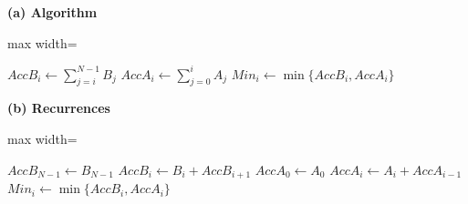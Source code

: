 


\begin{minipage}[t]{0.48\linewidth}
\textbf{(a) Algorithm}\par\smallskip
\begin{adjustbox}{max width=\linewidth}
\begin{minipage}{\textwidth}
\begin{algorithmic}[1]
    \State $AccB_i \gets \sum_{j=i}^{N-1} B_j$
    \State $AccA_i \gets \sum_{j=0}^{i} A_j$
    \State \mbox{$Min_i \gets \min\{AccB_i,AccA_i\}$}
\EndFor
\end{algorithmic}
\end{minipage}
\end{adjustbox}
\end{minipage}
\hfill
\begin{minipage}[t]{0.48\linewidth}
\textbf{(b) Recurrences}\par\smallskip
\begin{adjustbox}{max width=\linewidth}
\begin{minipage}{\textwidth}
\begin{algorithmic}[1]
\State $AccB_{N-1} \gets B_{N-1}$
    \State $AccB_i \gets B_i+AccB_{i+1}$
\EndFor
\State $AccA_0 \gets A_0$
    \State $AccA_i \gets A_i+AccA_{i-1}$
\EndFor
{}
    \State \mbox{$Min_i \gets \min\{AccB_i,AccA_i\}$}
\EndFor
\end{algorithmic}
\end{minipage}
\end{adjustbox}
\end{minipage}

\medskip

